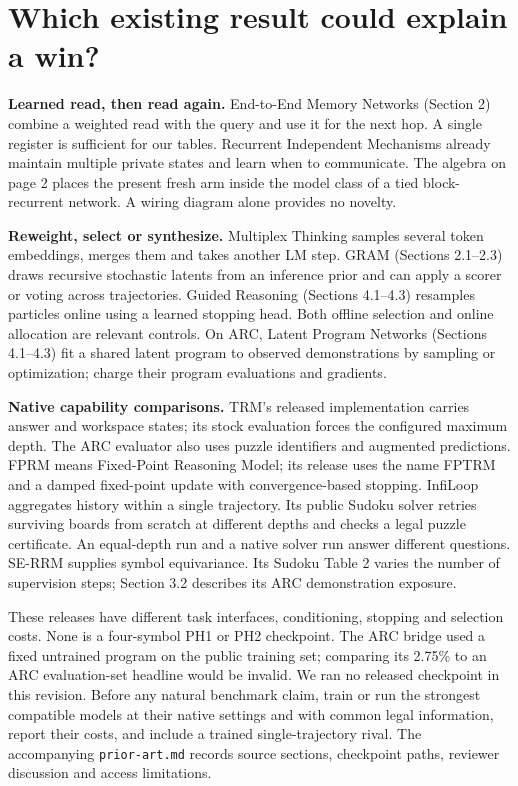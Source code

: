 \section*{Which existing result could explain a win?}
\textbf{Learned read, then read again.} End-to-End Memory Networks (Section 2) combine a weighted read with the query and use it for the next hop. A single register is sufficient for our tables. Recurrent Independent Mechanisms already maintain multiple private states and learn when to communicate. The algebra on page 2 places the present fresh arm inside the model class of a tied block-recurrent network. A wiring diagram alone provides no novelty. \cite{mem,rims}
\par
\textbf{Reweight, select or synthesize.} Multiplex Thinking samples several token embeddings, merges them and takes another LM step. GRAM (Sections 2.1--2.3) draws recursive stochastic latents from an inference prior and can apply a scorer or voting across trajectories. Guided Reasoning (Sections 4.1--4.3) resamples particles online using a learned stopping head. Both offline selection and online allocation are relevant controls. On ARC, Latent Program Networks (Sections 4.1--4.3) fit a shared latent program to observed demonstrations by sampling or optimization; charge their program evaluations and gradients. \cite{multiplex,gram,guided,lpn}
\par
\textbf{Native capability comparisons.} TRM's released implementation carries answer and workspace states; its stock evaluation forces the configured maximum depth. The ARC evaluator also uses puzzle identifiers and augmented predictions. FPRM means Fixed-Point Reasoning Model; its release uses the name FPTRM and a damped fixed-point update with convergence-based stopping. InfiLoop aggregates history within a single trajectory. Its public Sudoku solver retries surviving boards from scratch at different depths and checks a legal puzzle certificate. An equal-depth run and a native solver run answer different questions. SE-RRM supplies symbol equivariance. Its Sudoku Table 2 varies the number of supervision steps; Section 3.2 describes its ARC demonstration exposure. \cite{trm,fprm,infi,se}
\par
These releases have different task interfaces, conditioning, stopping and selection costs. None is a four-symbol PH1 or PH2 checkpoint. The ARC bridge used a fixed untrained program on the public training set; comparing its 2.75\% to an ARC evaluation-set headline would be invalid. We ran no released checkpoint in this revision. Before any natural benchmark claim, train or run the strongest compatible models at their native settings and with common legal information, report their costs, and include a trained single-trajectory rival. The accompanying \texttt{prior-art.md} records source sections, checkpoint paths, reviewer discussion and access limitations.
